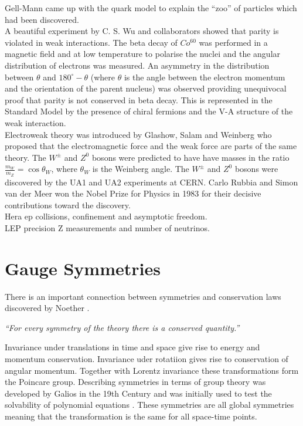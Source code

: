 Gell-Mann came up with the quark model to explain the ``zoo'' of particles which
had been discovered. \\

A beautiful experiment by C. S. Wu and collaborators showed that parity is
violated in weak interactions. The beta decay of $Co^{60}$ was performed in a
magnetic field and at low temperature to polarise the nuclei and the angular
distribution of electrons was measured. An asymmetry in the distribution between
$\theta$ and $180^{\circ} - \theta$ (where $\theta$ is the angle between the
electron momentum and the orientation of the parent nucleus) was observed
providing unequivocal proof that parity is not conserved in beta decay. This is
represented in the Standard Model by the presence of chiral fermions and the V-A 
structure of the weak interaction. \\

Electroweak theory was introduced by Glashow, Salam and Weinberg who proposed
that the electromagnetic force and the weak force are parts of the same theory. 
The $W^{\pm}$ and $Z^{0}$ bosons were predicted to have have masses in the ratio
$\frac{m_{W}}{m_{Z}} = \cos{\theta_{W}}$, where $\theta_{W}$ is the
Weinberg angle. The $W^{\pm}$ and $Z^{0}$ bosons were discovered by the UA1 and 
UA2 experiments at CERN. Carlo Rubbia and Simon van der Meer won the Nobel Prize
for Physics in 1983 for their decisive contributions toward the discovery. \\

Hera ep collisions, confinement and asymptotic freedom. \\

LEP precision Z measurements and number of neutrinos.

\section{Gauge Symmetries}

There is an important connection between symmetries and conservation laws
discovered by Noether \cite{noether}.

\begin{center}
{\it ``For every symmetry of the theory there is a conserved quantity.''} \\
\end{center}

Invariance under translations in time and space give rise to energy and momentum
conservation. Invariance uder rotatiion gives rise to conservation of angular
momentum. Together with Lorentz invariance these transformations form the
Poincare group. Describing symmetries in terms of group theory was developed by
Galios in the 19th Century and was initially used to test the solvability of 
polynomial equations \cite{galois}. These symmetries are all global symmetries
meaning that the transformation is the same for all space-time points. \\


